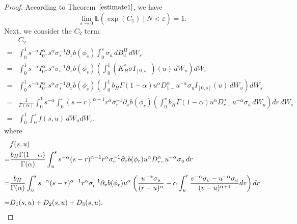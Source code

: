 \documentclass[preprint,12pt]{elsarticle}
\theoremstyle{definition}  %
\theoremstyle{plain}  %
\begin{document}
\begin{proof}
According to Theorem~$\ref{estimate1}$, we have
\[
\lim _{\varepsilon \to 0} \mathbb{E}\left( \exp \left( C_1 \right) \mid \tilde{N} < \varepsilon \right) = 1.
\]
	Next, we consider the $C_2$ term:
\begin{align*}
	&C_2\\  
	=& \int_0^1 s^{-\alpha} I_{0^+}^\alpha s^{\alpha} \sigma_s^{-1} 
	\partial_x b(\phi_s) \int_0^s \sigma_u \, dB^H_u \, dW_s   \\[6pt]
	=&\int_0^1 s^{-\alpha} I_{0^+}^\alpha s^{\alpha} \sigma_s^{-1}
	\partial_x b(\phi_s) 
	\left( \int_0^1 (K_H^*\sigma I_{[0,s]})(u) \, dW_u \right) dW_s \\[6pt]
	=&\int_0^1 s^{-\alpha} I_{0^+}^\alpha s^{\alpha} \sigma_s^{-1}
	\partial_x b(\phi_s) 
	\left( \int_0^1 b_H \Gamma(1-\alpha) u^{\alpha} D_{1-}^\alpha u^{-\alpha} 
	\sigma_u I_{[0,s]}(u) \, dW_u \right) dW_s \\[6pt]
	=& \frac{1}{\Gamma(\alpha)} \int_0^1 s^{-\alpha} 
	\int_0^s (s-r)^{\alpha-1} r^{\alpha} \sigma_r^{-1} 
	\partial_x b(\phi_r) 
	\left( \int_0^r b_H \Gamma(1-\alpha) u^{\alpha} D_{r-}^\alpha u^{-\alpha} 
	\sigma_u \, dW_u \right) dr \, dW_s \\[6pt]
	=& \int_0^1 \int_0^s f(s,u) \, dW_u dW_s ,
\end{align*}
where
\begin{align}
	\notag&f(s,u)\\
	=& \frac{b_H \Gamma(1-\alpha)}{\Gamma(\alpha)} 
	\int_u^s s^{-\alpha} (s-r)^{\alpha-1} r^{\alpha} 
	\sigma_r^{-1} \partial_x b(\phi_r) u^{\alpha} 
	D_{r-}^\alpha u^{-\alpha} \sigma_u \, dr  \label{fsu1} \\[6pt]
	=& \frac{b_H}{\Gamma(\alpha)} 
	\int_u^s s^{-\alpha} (s-r)^{\alpha-1} r^{\alpha} 
	\sigma_r^{-1} \partial_x b(\phi_r) u^{\alpha} 
	\left( \frac{u^{-\alpha}\sigma_u}{(r-u)^\alpha} 
	- \alpha \int_u^r \frac{v^{-\alpha}\sigma_v - u^{-\alpha}\sigma_u}{(v-u)^{\alpha+1}} dv \right) dr \notag \\[6pt]
	=& D_1(s,u) + D_2(s,u) + D_3(s,u). \notag
\end{align}


\end{proof}
\end{document}

